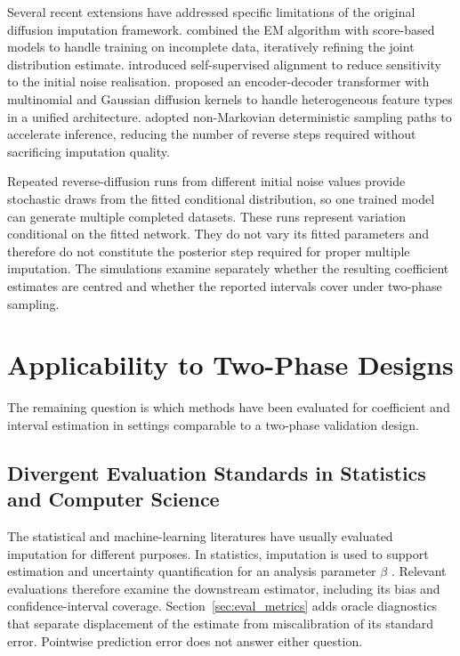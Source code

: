 Several recent extensions have addressed specific limitations of the original diffusion imputation framework. \citet{zhang2025diffputer} combined the EM algorithm with score-based models to handle training on incomplete data, iteratively refining the joint distribution estimate. \citet{liu2024simpdm} introduced self-supervised alignment to reduce sensitivity to the initial noise realisation. \citet{villaizan2025mtabgen} proposed an encoder-decoder transformer with multinomial and Gaussian diffusion kernels to handle heterogeneous feature types in a unified architecture. \citet{zhou2025missddim} adopted non-Markovian deterministic sampling paths to accelerate inference, reducing the number of reverse steps required without sacrificing imputation quality.

Repeated reverse-diffusion runs from different initial noise values provide stochastic draws from the fitted conditional distribution, so one trained model can generate multiple completed datasets. These runs represent variation conditional on the fitted network. They do not vary its fitted parameters and therefore do not constitute the posterior step required for proper multiple imputation. The simulations examine separately whether the resulting coefficient estimates are centred and whether the reported intervals cover under two-phase sampling.

\section{Applicability to Two-Phase Designs}
\label{sec:two_phase_applicability}

The remaining question is which methods have been evaluated for coefficient and interval estimation in settings comparable to a two-phase validation design.

\subsection{Divergent Evaluation Standards in Statistics and Computer Science}
\label{sec:3.5.1}

The statistical and machine-learning literatures have usually evaluated imputation for different purposes. In statistics, imputation is used to support estimation and uncertainty quantification for an analysis parameter $\beta$ \citep{Rubin1987, meng1994multiple}. Relevant evaluations therefore examine the downstream estimator, including its bias and confidence-interval coverage. Section~\ref{sec:eval_metrics} adds oracle diagnostics that separate displacement of the estimate from miscalibration of its standard error. Pointwise prediction error does not answer either question.

